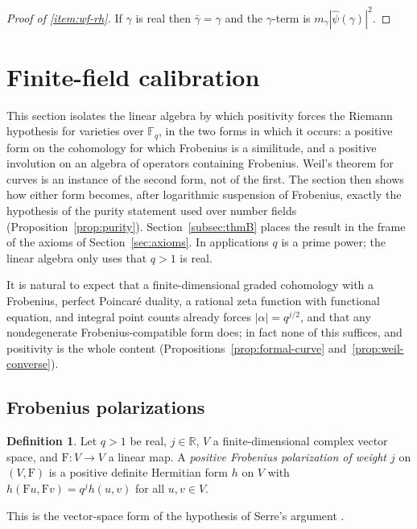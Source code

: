 \documentclass[11pt]{amsart}
\theoremstyle{plain}
\theoremstyle{definition}
\newtheorem{definition}[theorem]{Definition}
\theoremstyle{remark}
\numberwithin{equation}{section}
\newcommand{\R}{\mathbb{R}}
\newcommand{\F}{\mathbb{F}}
\begin{document}
\begin{proof}[Proof of \ref{item:wf-rh}]
If $\gamma$ is real then $\bar\gamma=\gamma$ and the $\gamma$-term is
$m_\gamma|\widehat\psi(\gamma)|^2$.
\end{proof}

\section{Finite-field calibration}\label{sec:finite-field}

This section isolates the linear algebra by which positivity forces the
Riemann hypothesis for varieties over $\F_q$, in the two forms in which
it occurs: a positive form on the cohomology for which Frobenius is a
similitude, and a positive involution on an algebra of operators
containing Frobenius. Weil's theorem for curves is an instance of the
second form, not of the first. The section then shows how either form
becomes, after logarithmic suspension of Frobenius, exactly the
hypothesis of the purity statement used over number fields
(Proposition~\ref{prop:purity}). Section~\ref{subsec:thmB} places the
result in the frame of the axioms of Section~\ref{sec:axioms}. In
applications $q$ is a prime power; the linear algebra only uses that
$q>1$ is real.

It is natural to expect that a finite-dimensional graded cohomology
with a Frobenius, perfect Poincar\'e duality, a rational zeta function
with functional equation, and integral point counts already forces
$|\alpha|=q^{j/2}$, and that any nondegenerate Frobenius-compatible form
does; in fact none of this suffices, and positivity is the whole
content (Propositions~\ref{prop:formal-curve}
and~\ref{prop:weil-converse}).

\subsection{Frobenius polarizations}\label{subsec:frob-pol}

\begin{definition}\label{def:frob-pol}
Let $q>1$ be real, $j\in\R$, $V$ a finite-dimensional complex vector
space, and $\mathrm{F}:V\to V$ a linear map. A \emph{positive Frobenius
polarization of weight $j$} on $(V,\mathrm{F})$ is a positive definite
Hermitian form $h$ on $V$ with
$h(\mathrm{F}u,\mathrm{F}v)=q^jh(u,v)$ for all $u,v\in V$.
\end{definition}

This is the vector-space form of the hypothesis of Serre's argument
\cite[Th\'eor\`eme~1 and its proof, pp.~392--393]{Serre1960Analogues}.
\end{document}
